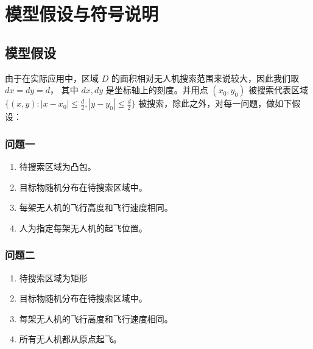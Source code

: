 \documentclass[bwprint]{gmcmthesis}
\numberwithin{figure}{section}
\begin{document}
\vspace*{1cm}
\section{模型假设与符号说明}
\subsection{模型假设}

	由于在实际应用中，区域 $D$ 的面积相对无人机搜索范围来说较大，因此我们取 $dx=dy=d$， 其中 $dx,dy$ 是坐标轴上的刻度。并用点 $(x_0,y_0)$ 被搜索代表区域 $\{(x,y):|x-x_0|\leq \frac{d}{2},|y-y_0|\leq \frac{d}{2}\}$ 被搜索，除此之外，对每一问题，做如下假设：

\subsubsection{问题一}
\begin{enumerate}
	\item 待搜索区域为凸包。
	\item 目标物随机分布在待搜索区域中。
	\item 每架无人机的飞行高度和飞行速度相同。
	\item 人为指定每架无人机的起飞位置。
\end{enumerate}

\subsubsection{问题二}
\begin{enumerate}
	\item 待搜索区域为矩形
	\item 目标物随机分布在待搜索区域中。
	\item 每架无人机的飞行高度和飞行速度相同。
	\item 所有无人机都从原点起飞。
\end{enumerate}
\end{document}
